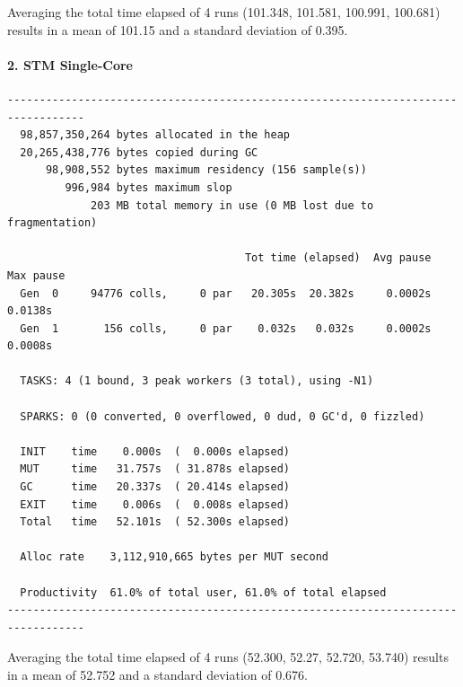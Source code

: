 Averaging the total time elapsed of 4 runs (101.348, 101.581, 100.991, 100.681) results in a mean of 101.15 and a standard deviation of 0.395.

\paragraph{2. STM Single-Core}
\begin{verbatim}
----------------------------------------------------------------------------------
  98,857,350,264 bytes allocated in the heap
  20,265,438,776 bytes copied during GC
      98,908,552 bytes maximum residency (156 sample(s))
         996,984 bytes maximum slop
             203 MB total memory in use (0 MB lost due to fragmentation)

                                     Tot time (elapsed)  Avg pause  Max pause
  Gen  0     94776 colls,     0 par   20.305s  20.382s     0.0002s    0.0138s
  Gen  1       156 colls,     0 par    0.032s   0.032s     0.0002s    0.0008s

  TASKS: 4 (1 bound, 3 peak workers (3 total), using -N1)

  SPARKS: 0 (0 converted, 0 overflowed, 0 dud, 0 GC'd, 0 fizzled)

  INIT    time    0.000s  (  0.000s elapsed)
  MUT     time   31.757s  ( 31.878s elapsed)
  GC      time   20.337s  ( 20.414s elapsed)
  EXIT    time    0.006s  (  0.008s elapsed)
  Total   time   52.101s  ( 52.300s elapsed)

  Alloc rate    3,112,910,665 bytes per MUT second

  Productivity  61.0% of total user, 61.0% of total elapsed
----------------------------------------------------------------------------------
\end{verbatim}

Averaging the total time elapsed of 4 runs (52.300, 52.27, 52.720, 53.740) results in a mean of 52.752 and a standard deviation of 0.676.

